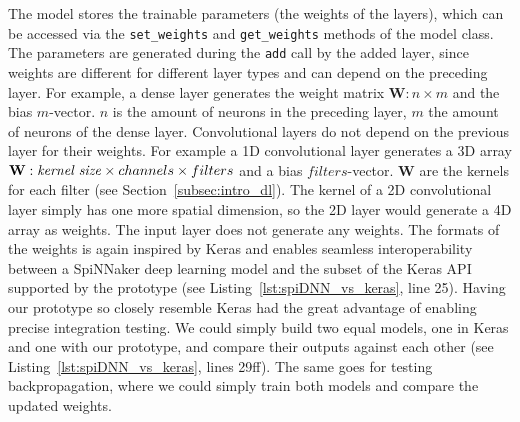 \documentclass[]{article}
\begin{document}
The model stores the trainable parameters (the weights of the layers),
which can be accessed via the \texttt{set\_weights} and
\texttt{get\_weights} methods of the model class.
The parameters are generated during the \texttt{add} call by the
added layer, since weights are different for different layer types
and can depend on the preceding layer.
For example, a dense layer generates the weight matrix
$\mathbf{W}: n \times m$ and the bias $m$-vector.
$n$ is the amount of neurons in the preceding layer, $m$ the amount of
neurons of the dense layer.
Convolutional layers do not depend on the previous layer for their
weights.
For example a 1D convolutional layer generates a $3$D array
$\mathbf{W}: \text{\textit{kernel size}} \times channels \times
filters$ and a bias $filters$-vector.
$\mathbf{W}$ are the kernels for each filter (see
Section~\ref{subsec:intro_dl}).
The kernel of a 2D convolutional layer simply has one more spatial
dimension, so the 2D layer would generate a 4D array as weights.
The input layer does not generate any weights.
The formats of the weights is again inspired by Keras and enables
seamless interoperability between a SpiNNaker deep learning model and
the subset of the Keras API supported by the prototype
(see Listing~\ref{lst:spiDNN_vs_keras}, line 25).
Having our prototype so closely resemble Keras had the great advantage
of enabling precise integration testing.
We could simply build two equal models, one in Keras and one with our
prototype, and compare their outputs against each other
(see Listing~\ref{lst:spiDNN_vs_keras}, lines 29ff).
The same goes for testing backpropagation, where we could simply train
both models and compare the updated weights.
\end{document}
